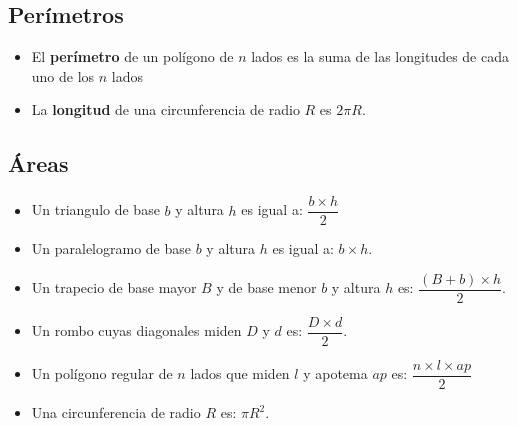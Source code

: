 \documentclass[10pt]{article}
\begin{document}
\subsection{Perímetros}
\begin{itemize}
\item El \textbf{perímetro} de un polígono de $n$ lados es la suma de las longitudes de cada uno de los $n$ lados
\item La \textbf{longitud} de una circunferencia de radio $R$ es $2 \pi R$.
\end{itemize}
\subsection{Áreas}
\begin{itemize}
\item Un triangulo de base $b$ y altura $h$ es igual a: $\dfrac{b \times h}{2}$
\item Un paralelogramo de base $b$ y altura $h$ es igual a: $b \times h$.
\item Un trapecio de base mayor $B$ y de base menor $b$ y altura $h$ es: $\dfrac{(B + b) \times h} {2}$.
\item Un rombo cuyas diagonales miden $D$ y $d$ es: $\dfrac{D \times d}{2}$.
\item Un polígono regular de $n$ lados que miden $l$ y apotema $ap$ es: $\dfrac{n \times l \times ap}{2}$
\item Una circunferencia de radio $R$ es: $\pi R^2$.
\end{itemize}
\newpage
\end{document}
